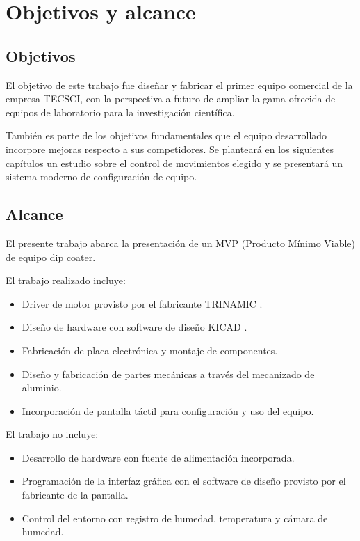 
\section{Objetivos y alcance}

\subsection{Objetivos}

El objetivo de este trabajo fue diseñar y fabricar el primer equipo comercial de la empresa TECSCI, con la perspectiva a futuro de ampliar la gama ofrecida de equipos de laboratorio para la investigación científica.

También es parte de los objetivos fundamentales que el equipo desarrollado incorpore mejoras respecto a sus competidores. Se planteará en los siguientes capítulos un estudio sobre el control de movimientos elegido y se presentará un sistema moderno de configuración de equipo. 

\subsection{Alcance}

El presente trabajo abarca la presentación de un MVP (Producto Mínimo Viable) de equipo dip coater. 


El trabajo realizado incluye:

\begin{itemize}
\item Driver de motor provisto por el fabricante TRINAMIC \citep{3_web_trinamic}.
\item Diseño de hardware con software de diseño KICAD \citep{web_kicad}.
\item Fabricación de placa electrónica y montaje de componentes.
\item Diseño y fabricación de partes mecánicas a través del mecanizado de aluminio.
\item Incorporación de pantalla táctil para configuración y uso del equipo.
\end{itemize}



El trabajo no incluye:

\begin{itemize}
\item Desarrollo de hardware con fuente de alimentación incorporada.
\item Programación de la interfaz gráfica con el software de diseño provisto por
el fabricante de la pantalla.
\item Control del entorno con registro de humedad, temperatura y  cámara de humedad.
\end{itemize}



